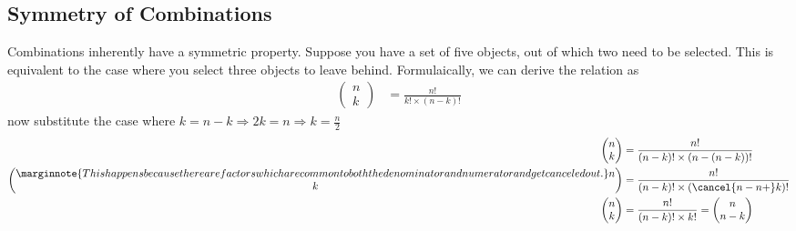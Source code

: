 \subsection{Symmetry of Combinations}
Combinations inherently have a symmetric property. Suppose you have a set of five objects, out of which two need to be selected. This is equivalent to the case where you select three objects to leave behind. Formulaically, we can derive the relation as
\begin{align}
    \begin{pmatrix}
        n \\k
    \end{pmatrix} & = \frac{n!}{k!\times (n-k)!} \nonumber
\end{align}
now substitute the case where \mbox{$k=n-k \Rightarrow 2k = n \Rightarrow k = \frac{n}{2}$}
\begin{align}
    \begin{pmatrix}
        n \\k
    \end{pmatrix}                                                                                                                                  & = \frac{n!}{(n-k)!\times (n-(n-k))!} \nonumber              \\
    \begin{pmatrix} \marginnote{This happens because there are factors which are common to both the denominator and numerator and get canceled out.}
        n \\k
    \end{pmatrix} & = \frac{n!}{(n-k)!\times (\cancel{n-n+}k)!} \nonumber                                                              \\
    \begin{pmatrix}
        n \\k
    \end{pmatrix}                                                                                                                                  & = \frac{n!}{(n-k)!\times k!} =     \begin{pmatrix}
                                                                                                                                                                                            n \\n-k
                                                                                                                                                                                        \end{pmatrix}\nonumber \
\end{align}

